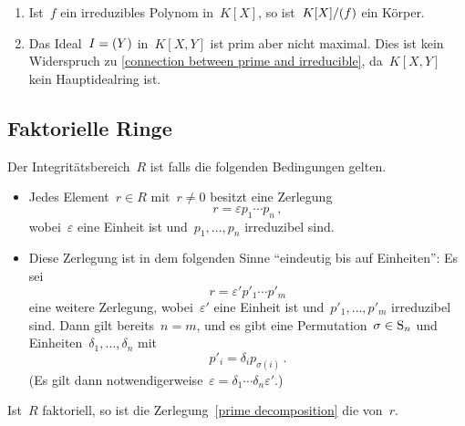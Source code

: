 \begin{example}
  \leavevmode
  \begin{enumerate}
     \item
       Ist~$f$ ein irreduzibles Polynom in~$K[X]$, so ist~$K[X] / (f)$ ein Körper.
     \item
       Das Ideal~$I = (Y)$ in~$K[X,Y]$ ist prim aber nicht maximal.
       Dies ist kein Widerspruch zu \cref{connection between prime and irreducible}, da~$K[X,Y]$ kein Hauptidealring ist.
  \end{enumerate}
\end{example}



\subsection{Faktorielle Ringe}

\begin{definition}
  Der Integritätsbereich~$R$ ist  falls die folgenden Bedingungen gelten.
  \begin{itemize}
    \item
      Jedes Element~$r \in R$ mit~$r \neq 0$ besitzt eine Zerlegung
      \begin{equation}
        \label{prime decomposition}
        r = \varepsilon p_1 \dotsm p_n \,,
      \end{equation}
      wobei~$\varepsilon$ eine Einheit ist und~$p_1, \dotsc, p_n$ irreduzibel sind.
    \item
      Diese Zerlegung ist in dem folgenden Sinne \enquote{eindeutig bis auf Einheiten}:
      Es sei
      \[
        r = \varepsilon' p'_1 \dotsm p'_m
      \]
      eine weitere Zerlegung, wobei~$\varepsilon'$ eine Einheit ist und~$p'_1, \dotsc, p'_m$ irreduzibel sind.
      Dann gilt bereits~$n = m$, und es gibt eine Permutation~$\sigma \in \operatorname{S}_n$ und Einheiten~$\delta_1, \dotsc, \delta_n$ mit
      \[
        p'_i = \delta_i p_{\sigma(i)} \,.
      \]
      (Es gilt dann notwendigerweise~$\varepsilon = \delta_1 \dotsm \delta_n \varepsilon'$.)
  \end{itemize}
  Ist~$R$ faktoriell, so ist die Zerlegung~\eqref{prime decomposition} die  von~$r$.
\end{definition}

